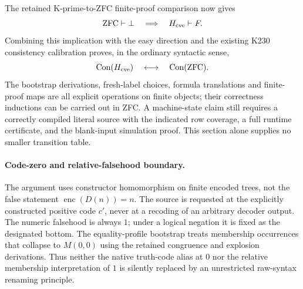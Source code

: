 The retained K-prime-to-ZFC finite-proof comparison now gives
\[
 \mathrm{ZFC}\vdash\bot\quad\Longrightarrow\quad
 H_{\rm cve}\vdash F.
\]
Combining this implication with the easy direction and the existing
K230 consistency calibration proves, in the ordinary syntactic sense,
\[
 \operatorname{Con}(H_{\rm cve})
   \quad\longleftrightarrow\quad\operatorname{Con}(\mathrm{ZFC}).
\]
The bootstrap derivations, fresh-label choices, formula translations and
finite-proof maps are all explicit operations on finite objects; their
correctness inductions can be carried out in ZFC.  A machine-state claim
still requires a correctly compiled literal source with the indicated
row coverage, a full runtime certificate, and the blank-input simulation
proof.  This section alone supplies no smaller transition table.

\paragraph{Code-zero and relative-falsehood boundary.}
The argument uses constructor homomorphism on finite encoded trees,
not the false statement $\operatorname{enc}(D(n))=n$.  The source is
requested at the explicitly constructed positive code $c'$, never at
a recoding of an arbitrary decoder output.  The numeric falsehood is
always $1$; under a logical negation it is fixed as the designated
bottom.  The equality-profile bootstrap treats membership occurrences
that collapse to $M(0,0)$ using the retained congruence and explosion
derivations.  Thus neither the native truth-code alias at $0$ nor the
relative membership interpretation of $1$ is silently replaced by an
unrestricted raw-syntax renaming principle.
